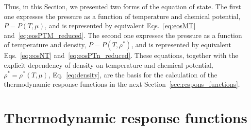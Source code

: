 Thus, in this Section, we presented two forms of the equation of state. The first one expresses the pressure as a function of temperature and chemical potential, $P = P(T, \mu)$, and is represented by equivalent Eqs.~\eqref{eq:eosMT} and~\eqref{eq:eosPTM_reduced}. The second one expresses the pressure as a function of temperature and density, $P = P(T, \rho^*)$, and is represented by equivalent Eqs.~\eqref{eq:eosNT} and~\eqref{eq:eosPTn_reduced}. These equations, together with the explicit dependency of density on temperature and chemical potential, $\rho^* = \rho^*(T, \mu)$, Eq.~\eqref{eq:density}, are the basis for the calculation of the thermodynamic response functions in the next Section~\ref{sec:respons_functions}. 

\section{\label{sec:respons_functions}Thermodynamic response functions}

